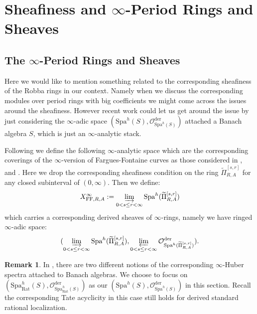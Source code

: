\documentclass[12pt]{amsart}
\theoremstyle{definition}
\newtheorem{remark}[theorem]{Remark}
\numberwithin{equation}{section}
\begin{document}





\newpage


\section{Sheafiness and $\infty$-Period Rings and Sheaves} \label{section4}

\subsection{The $\infty$-Period Rings and Sheaves}

\noindent Here we would like to mention something related to the corresponding sheafiness of the Robba rings in our context. Namely when we discuss the corresponding modules over period rings with big coefficients we might come across the issues around the sheafiness. However recent work \cite{BK} could let us get around the issue by just considering the $\infty$-adic space $(\mathrm{Spa}^h(S), \mathcal{O}^\mathrm{der}_{\mathrm{Spa}^h(S)})$ attached a Banach algebra $S$, which is just an $\infty$-analytic stack.	


\indent Following \cite[Introduction]{BK} we define the following $\infty$-analytic space which are the corresponding coverings of the $\infty$-version of Fargues-Fontaine curves as those considered in \cite{KL1}, \cite{KL2} and \cite{T2}. Here we drop the corresponding sheafiness condition on the ring $\widetilde{\Pi}^{[s,r]}_{R,A}$ for any closed subinterval of $(0,\infty)$. Then we define:
\begin{displaymath}
X^\infty_{\mathrm{FF},R,A}:= \varinjlim_{0<s\leq r< \infty} \mathrm{Spa}^h(\widetilde{\Pi}^{[s,r]}_{R,A})	
\end{displaymath}
which carries a corresponding derived sheaves of $\infty$-rings, namely we have ringed $\infty$-adic space:
\begin{align}
(\varinjlim_{0<s\leq r< \infty} \mathrm{Spa}^h(\widetilde{\Pi}^{[s,r]}_{R,A}), \varprojlim_{0<s\leq r< \infty}\mathcal{O}^\mathrm{der}_{\mathrm{Spa}^h(\widetilde{\Pi}^{[s,r]}_{R,A})}).	
\end{align}



\begin{remark}
In \cite{BK}, there are two different notions of the corresponding $\infty$-Huber spectra attached to Banach algebras. We choose to focus on $(\mathrm{Spa}^h_\mathrm{Rat}(S), \mathcal{O}^\mathrm{der}_{\mathrm{Spa}_\mathrm{Rat}^h(S)})$ as our $(\mathrm{Spa}^h(S), \mathcal{O}^\mathrm{der}_{\mathrm{Spa}^h(S)})$ in this section. Recall the corresponding Tate acyclicity in this case still holds for derived standard rational localization.	
\end{remark}
\end{document}

